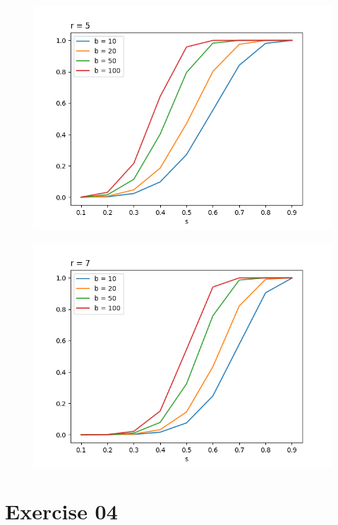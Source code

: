 \documentclass[11pt,a4paper]{scrartcl}
\begin{document}
\begin{figure}
\centering
\begin{minipage}{.5\textwidth}
  \centering
  \includegraphics[width=.99\linewidth]{q3r5}
  \label{fig:r5}
\end{minipage}%
\begin{minipage}{.5\textwidth}
  \centering
  \includegraphics[width=.99\linewidth]{q3r7}
  \label{fig:r7}
\end{minipage}
\end{figure}

\section*{Exercise 04}
\end{document}
